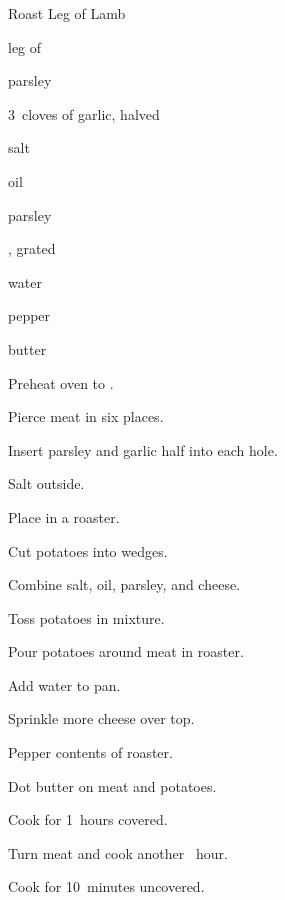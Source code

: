 \begin{recipe}{Roast Leg of Lamb}{}{}

\begin{ingredients}
\item leg of 
\item parsley
\item 3~cloves of garlic, halved
\item salt
\item oil
\item parsley
\item {}, grated
\item \C{\half} water
\item pepper
\item butter
\end{ingredients}

\begin{directions}
\item Preheat oven to .
\item Pierce meat in six places.
\item Insert parsley and garlic half into each hole.
\item Salt outside.
\item Place in a roaster.
\item Cut potatoes into wedges.
\item Combine salt, oil, parsley, and cheese.
\item Toss potatoes in mixture.
\item Pour potatoes around meat in roaster.
\item Add water to pan.
\item Sprinkle more cheese over top.
\item Pepper contents of roaster.
\item Dot butter on meat and potatoes.
\item Cook for 1\half~hours covered.
\item Turn meat and cook another \half~hour.
\item Cook for 10~minutes uncovered.
\end{directions}

\end{recipe}
